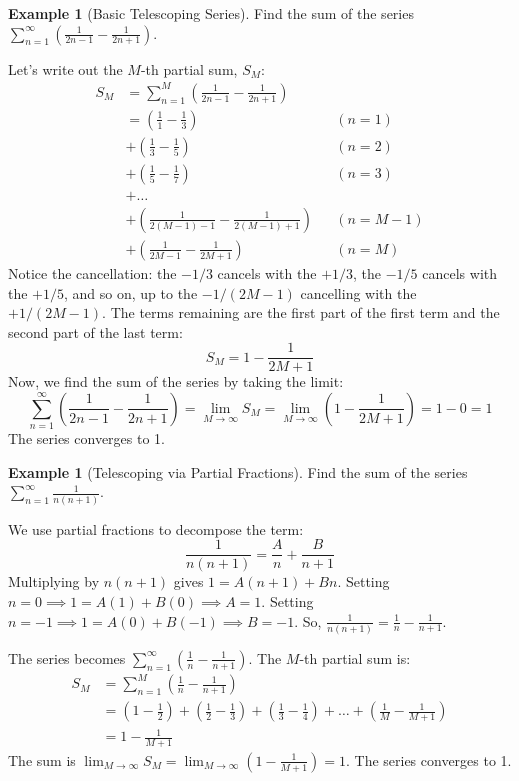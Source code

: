 \documentclass[11pt]{article}
\theoremstyle{definition}
\newtheorem{example}[theorem]{Example}
\theoremstyle{remark}
\begin{document}
\begin{example}[Basic Telescoping Series] \label{ex:telescope1}
Find the sum of the series $\sum_{n=1}^\infty \left(\frac{1}{2n-1} - \frac{1}{2n+1}\right)$.

Let's write out the $M$-th partial sum, $S_M$:
\begin{align*} S_M &= \sum_{n=1}^M \left(\frac{1}{2n-1} - \frac{1}{2n+1}\right) \\ &= \left(\frac{1}{1} - \frac{1}{3}\right) && (n=1) \\ &+ \left(\frac{1}{3} - \frac{1}{5}\right) && (n=2) \\ &+ \left(\frac{1}{5} - \frac{1}{7}\right) && (n=3) \\ &+ \dots \\ &+ \left(\frac{1}{2(M-1)-1} - \frac{1}{2(M-1)+1}\right) && (n=M-1) \\ &+ \left(\frac{1}{2M-1} - \frac{1}{2M+1}\right) && (n=M) \end{align*}
Notice the cancellation: the $-1/3$ cancels with the $+1/3$, the $-1/5$ cancels with the $+1/5$, and so on, up to the $-1/(2M-1)$ cancelling with the $+1/(2M-1)$.
The terms remaining are the first part of the first term and the second part of the last term:
\[ S_M = 1 - \frac{1}{2M+1} \]
Now, we find the sum of the series by taking the limit:
\[ \sum_{n=1}^\infty \left(\frac{1}{2n-1} - \frac{1}{2n+1}\right) = \lim_{M\to\infty} S_M = \lim_{M\to\infty} \left(1 - \frac{1}{2M+1}\right) = 1 - 0 = 1 \]
The series converges to 1.
\end{example}

\begin{example}[Telescoping via Partial Fractions] \label{ex:telescope_pf}
Find the sum of the series $\sum_{n=1}^\infty \frac{1}{n(n+1)}$.

We use partial fractions to decompose the term:
\[ \frac{1}{n(n+1)} = \frac{A}{n} + \frac{B}{n+1} \]
Multiplying by $n(n+1)$ gives $1 = A(n+1) + Bn$.
Setting $n=0 \implies 1 = A(1) + B(0) \implies A=1$.
Setting $n=-1 \implies 1 = A(0) + B(-1) \implies B=-1$.
So, $\frac{1}{n(n+1)} = \frac{1}{n} - \frac{1}{n+1}$.

The series becomes $\sum_{n=1}^\infty \left(\frac{1}{n} - \frac{1}{n+1}\right)$.
The $M$-th partial sum is:
\begin{align*} S_M &= \sum_{n=1}^M \left(\frac{1}{n} - \frac{1}{n+1}\right) \\ &= \left(1 - \frac{1}{2}\right) + \left(\frac{1}{2} - \frac{1}{3}\right) + \left(\frac{1}{3} - \frac{1}{4}\right) + \dots + \left(\frac{1}{M} - \frac{1}{M+1}\right) \\ &= 1 - \frac{1}{M+1} \end{align*}
The sum is $\lim_{M\to\infty} S_M = \lim_{M\to\infty} \left(1 - \frac{1}{M+1}\right) = 1$.
The series converges to 1.
\end{example}
\end{document}
